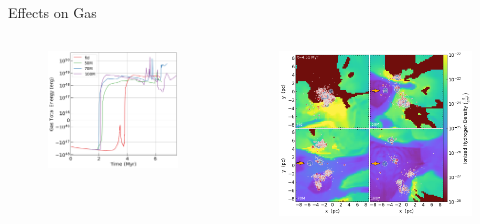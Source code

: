 \documentclass[aspectratio=169]{beamer}
\begin{document}
\begin{frame}{Effects on Gas}{}
    \begin{columns}
        \begin{column}{0.45\textwidth}
            \begin{figure}[h!]
                \centering
                \includegraphics[width=\linewidth]{../images/global_gas_total_energy_fixes.png} \\
                \label{fig:energy}
            \end{figure}
        \end{column}
        \begin{column}{0.45\textwidth}
            \begin{figure}[h!]
                \centering
                \includegraphics[width=\linewidth]{../images/ionized_H_slice.png} \\
                \label{fig:ionized}
            \end{figure}
        \end{column}
    \end{columns}
\end{frame} 
\end{document}
